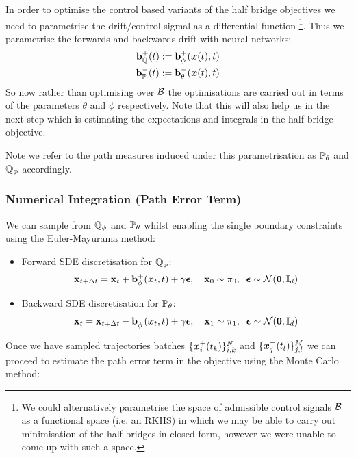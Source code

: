\documentclass[a4paper,12pt,twoside,openright]{report}
\theoremstyle{definition}
\begin{document}
In order to optimise the control based variants of the half bridge objectives we need to parametrise the drift/control-sigmal as a differential function \footnote{We could alternatively parametrise the space of admissible control signals $\calB$ as a functional space (i.e. an  RKHS) in which we may be able to carry out minimisation of the half bridges in closed form, however we were unable to come up with such a space.}. Thus we parametrise the forwards and backwards drift with neural networks:
\begin{align}
    \rvb^{+}_{\Q}(t) := \rvb^{+}_{\phi}(\vx(t), t) \nonumber \\
    \rvb^{-}_{\P}(t) := \rvb^{-}_{\theta}(\vx(t), t)
\end{align}
So now rather than optimising over $\calB$ the optimisations are carried out in terms of the parameters $\theta$ and $\phi$ respectively. Note that this will also help us in the next step which is estimating the expectations and integrals in the half bridge objective.

Note we refer to the path measures induced under this parametrisation as $\P_{\theta}$ and $\Q_{\phi}$ accordingly.

\subsubsection{Numerical Integration (Path Error Term)}
We can sample from $\Q_{\phi}$ and $\P_{\theta}$ whilst enabling the single boundary constraints using the Euler-Mayurama method:
\begin{itemize}
    \item  Forward SDE discretisation for $\Q_{\phi}$:
\begin{align*}
    \rvx_{t + \Delta t} = \rvx_t + \rvb^{+}_{\phi}(\vx_t, t) + \gamma \rvepsilon, \quad \rvx_0 \sim \pi_0, \;\;\rvepsilon \sim \calN(\vzero, \I) 
\end{align*}
    \item  Backward SDE discretisation for $\P_{\theta}$:
\begin{align*}
    \rvx_{t} = \rvx_{t+\Delta t} - \rvb^{-}_{\phi}(\vx_t, t) + \gamma \rvepsilon, \quad \rvx_1 \sim \pi_1,\;\; \rvepsilon \sim \calN(\vzero, \I)
\end{align*}
\end{itemize}

Once we have sampled trajectories batches $\{\vx^{+}_i(t_k)\}_{i,k}^N$ and $\{\vx^{-}_j(t_l)\}_{j,l}^M$ we can proceed to estimate the path error term in the objective using the Monte Carlo  method:
\end{document}
